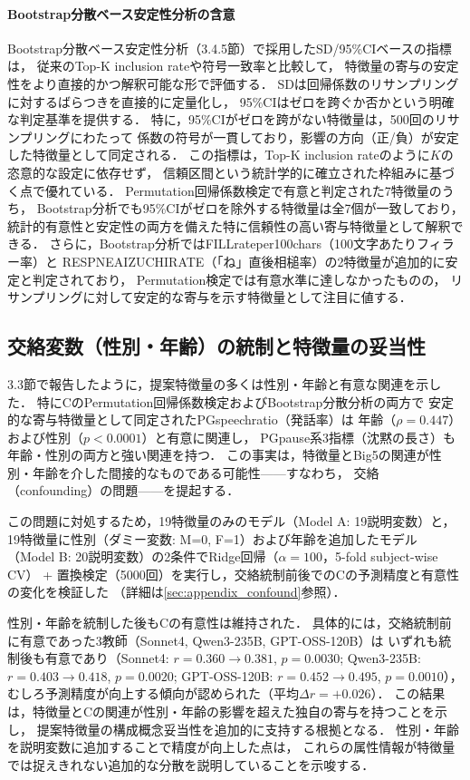 \documentclass[dvipdfmx,11pt,a4paper]{bxjsarticle}
\renewcommand{\_}{\paperorigunderscore\allowbreak}%
\begin{document}
\paragraph{Bootstrap分散ベース安定性分析の含意}
Bootstrap分散ベース安定性分析（3.4.5節）で採用したSD/95\%CIベースの指標は，
従来のTop-K inclusion rateや符号一致率と比較して，
特徴量の寄与の安定性をより直接的かつ解釈可能な形で評価する．
SDは回帰係数のリサンプリングに対するばらつきを直接的に定量化し，
95\%CIはゼロを跨ぐか否かという明確な判定基準を提供する．
特に，95\%CIがゼロを跨がない特徴量は，500回のリサンプリングにわたって
係数の符号が一貫しており，影響の方向（正/負）が安定した特徴量として同定される．
この指標は，Top-K inclusion rateのように$K$の恣意的な設定に依存せず，
信頼区間という統計学的に確立された枠組みに基づく点で優れている．
Permutation回帰係数検定で有意と判定された7特徴量のうち，
Bootstrap分析でも95\%CIがゼロを除外する特徴量は全7個が一致しており，
統計的有意性と安定性の両方を備えた特に信頼性の高い寄与特徴量として解釈できる．
さらに，Bootstrap分析ではFILL\_rate\_per\_100chars（100文字あたりフィラー率）と
RESP\_NE\_AIZUCHI\_RATE（「ね」直後相槌率）の2特徴量が追加的に安定と判定されており，
Permutation検定では有意水準に達しなかったものの，
リサンプリングに対して安定的な寄与を示す特徴量として注目に値する．

\subsection{交絡変数（性別・年齢）の統制と特徴量の妥当性}

3.3節で報告したように，提案特徴量の多くは性別・年齢と有意な関連を示した．
特にCのPermutation回帰係数検定およびBootstrap分散分析の両方で
安定的な寄与特徴量として同定されたPG\_speech\_ratio（発話率）は
年齢（$\rho = 0.447$）および性別（$p < 0.0001$）と有意に関連し，
PG\_pause系3指標（沈黙の長さ）も年齢・性別の両方と強い関連を持つ．
この事実は，特徴量とBig5の関連が性別・年齢を介した間接的なものである可能性——すなわち，
交絡（confounding）の問題——を提起する．

この問題に対処するため，19特徴量のみのモデル（Model A: 19説明変数）と，
19特徴量に性別（ダミー変数: M=0, F=1）および年齢を追加したモデル
（Model B: 20説明変数）の2条件でRidge回帰（$\alpha = 100$，5-fold subject-wise CV）
+ 置換検定（5000回）を実行し，交絡統制前後でのCの予測精度と有意性の変化を検証した
（詳細は\ref{sec:appendix_confound}参照）．

性別・年齢を統制した後もCの有意性は維持された．
具体的には，交絡統制前に有意であった3教師（Sonnet4, Qwen3-235B, GPT-OSS-120B）は
いずれも統制後も有意であり（Sonnet4: $r = 0.360 \to 0.381$, $p = 0.0030$;
Qwen3-235B: $r = 0.403 \to 0.418$, $p = 0.0020$;
GPT-OSS-120B: $r = 0.452 \to 0.495$, $p = 0.0010$），
むしろ予測精度が向上する傾向が認められた（平均$\Delta r = +0.026$）．
この結果は，特徴量とCの関連が性別・年齢の影響を超えた独自の寄与を持つことを示し，
提案特徴量の構成概念妥当性を追加的に支持する根拠となる．
性別・年齢を説明変数に追加することで精度が向上した点は，
これらの属性情報が特徴量では捉えきれない追加的な分散を説明していることを示唆する．
\end{document}
